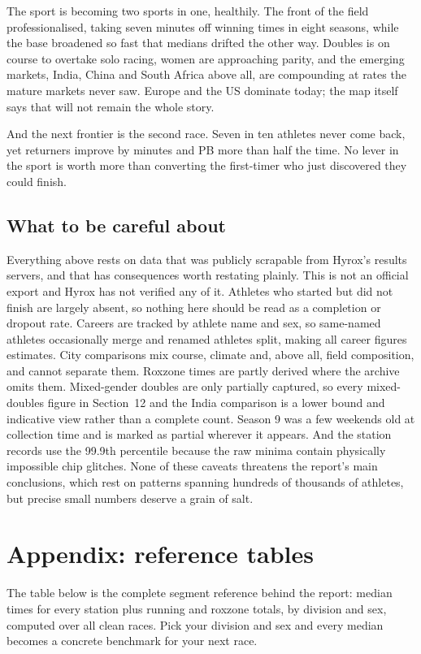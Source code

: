 \documentclass[11pt,a4paper]{article}
\newcommand{\tabfrag}[2]{%
\begin{table}[!htbp]\centering\small

\caption{#2}\label{tab:#1}
\end{table}}
\begin{document}
The sport is becoming two sports in one, healthily. The front of the field
professionalised, taking seven minutes off winning times in eight seasons,
while the base broadened so fast that medians drifted the other way.
Doubles is on course to overtake solo racing, women are approaching parity,
and the emerging markets, India, China and South Africa above all, are
compounding at rates the mature markets never saw. Europe and the US
dominate today; the map itself says that will not remain the whole story.

And the next frontier is the second race. Seven in ten athletes never come
back, yet returners improve by minutes and PB more than half the time.
No lever in the sport is worth more than converting the first-timer who
just discovered they could finish.

\subsection*{What to be careful about}

Everything above rests on data that was publicly scrapable from Hyrox's
results servers, and that has consequences worth restating plainly. This is
not an official export and Hyrox has not verified any of it. Athletes who
started but did not finish are largely absent, so nothing here should be
read as a completion or dropout rate. Careers are tracked by athlete name
and sex, so same-named athletes occasionally merge and renamed athletes
split, making all career figures estimates. City comparisons mix course,
climate and, above all, field composition, and cannot separate them.
Roxzone times are partly derived where the archive omits them. Mixed-gender
doubles are only partially captured, so every mixed-doubles figure in
Section~12 and the India comparison is a lower bound and indicative view
rather than a complete count. Season 9 was a few weekends old at collection
time and is marked as partial wherever it appears. And the station records
use the 99.9th percentile because the raw minima contain physically
impossible chip glitches. None of these caveats threatens the report's main
conclusions, which rest on patterns spanning hundreds of thousands of
athletes, but precise small numbers deserve a grain of salt.

\appendix

\section{Appendix: reference tables}

The table below is the complete segment reference behind the report: median
times for every station plus running and roxzone totals, by division and
sex, computed over all clean races. Pick your division and sex and every
median becomes a concrete benchmark for your next race.

\tabfrag{station_stats}{Median segment times by division and sex, clean
races, all time.}
\end{document}
